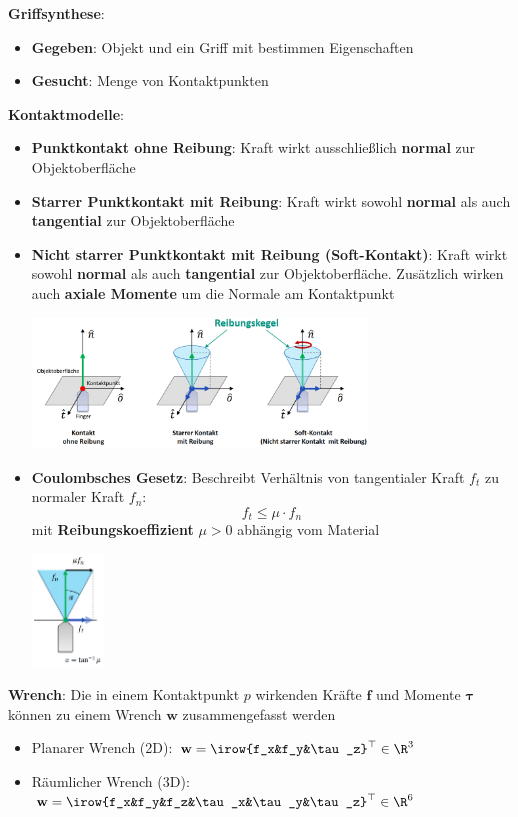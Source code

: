 \textbf{Griffsynthese}:
\begin{itemize}
	\item \textbf{Gegeben}: Objekt und ein Griff mit bestimmen Eigenschaften
	\item \textbf{Gesucht}: Menge von Kontaktpunkten
\end{itemize}
\bigskip
\textbf{Kontaktmodelle}: 
\begin{itemize}
	\item \textbf{Punktkontakt ohne Reibung}: Kraft wirkt ausschließlich \textbf{normal} zur Objektoberfläche
	\item \textbf{Starrer Punktkontakt mit Reibung}: Kraft wirkt sowohl \textbf{normal} als auch \textbf{tangential} zur Objektoberfläche
	\item \textbf{Nicht starrer Punktkontakt mit Reibung (Soft-Kontakt)}: Kraft wirkt sowohl \textbf{normal} als auch \textbf{tangential} zur Objektoberfläche. Zusätzlich wirken auch \textbf{axiale Momente} um die Normale am Kontaktpunkt
	\begin{center}
		\includegraphics[width=0.7\textwidth]{images/kraftmodelle.png}
	\end{center}
	\item \textbf{Coulombsches Gesetz}: Beschreibt Verhältnis von tangentialer Kraft $f_t$ zu normaler Kraft $f_n$:
	$$f_t\leq\mu\cdot f_n$$
	mit \textbf{Reibungskoeffizient} $\mu>0$ abhängig vom Material
	\begin{center}
		\includegraphics[width=0.15\textwidth]{images/coulomb.png}
	\end{center}
\end{itemize}
\bigskip
\textbf{Wrench}: Die in einem Kontaktpunkt $p$ wirkenden Kräfte $\mathbf{f}$ und Momente $\boldsymbol{\tau}$ können zu einem Wrench $\mathbf{w}$ zusammengefasst werden
\begin{itemize}
	\item Planarer Wrench (2D): $\mathbf{w}=\irow{f_x&f_y&\tau_z}^\top\in\R^3$
	\item Räumlicher Wrench (3D): $\mathbf{w}=\irow{f_x&f_y&f_z&\tau_x&\tau_y&\tau_z}^\top\in\R^6$
\end{itemize}
